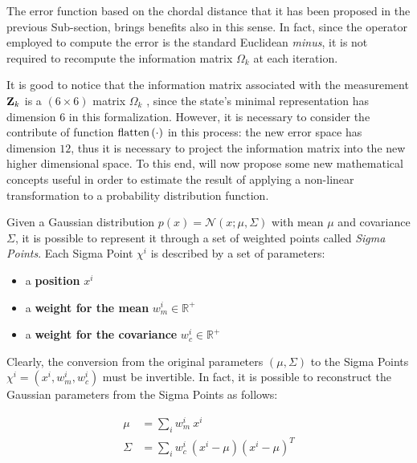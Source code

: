 The error function based on the chordal distance that it has been proposed in the previous Sub-section, brings benefits also in this sense. In fact, since the operator employed to compute the error is the standard Euclidean \textit{minus}, it is not required to recompute the information matrix $\Omega_k$ at each iteration. 

It is good to notice that the information matrix associated with the measurement $\mathbf{Z}_{k}$ is a $(6\times6)$ matrix $\Omega_k$ , since the state's minimal representation has dimension $6$ in this formalization. However, it is necessary to consider the contribute of function $\text{flatten}\left({\cdot}\right)$ in this process: the new error space has dimension $12$, thus it is necessary to project the information matrix into the new higher dimensional space. To this end, will now propose some new mathematical concepts useful in order to estimate the result of applying a non-linear transformation to a probability distribution function. 

Given a Gaussian distribution $p(x) = \mathcal{N}(x; \mu, \Sigma)$ with mean $\mu$ and covariance $\Sigma$, it is possible to represent it through a set of weighted points called \textit{Sigma Points}. Each Sigma Point $\chi^i$ is described by a set of parameters:

\begin{itemize}
    \item a \textbf{position} $x^i$
    \item a \textbf{weight for the mean} $w_m^i \in \mathbb{R}^+$
    \item a \textbf{weight for the covariance} $w_c^i \in \mathbb{R}^+$
\end{itemize}

\noindent Clearly, the conversion from the original parameters $(\mu, \Sigma)$ to the Sigma Points $\chi^i = (x^i, w_m^i, w_c^i)$ must be invertible. In fact, it is possible to reconstruct the Gaussian parameters from the Sigma Points as follows:

\begin{align}
    \label{eq:sigma_to_mean}
    \mu &= \sum_i w_m^i \: x^i \\ 
    \label{eq:sigma_to_covariance}
    \Sigma &= \sum_i w_c^i\:(x^i - \mu)(x^i - \mu)^T
\end{align}

